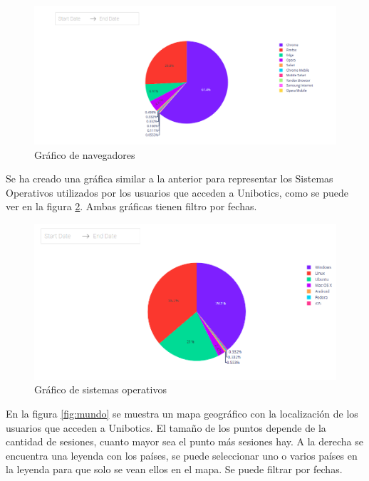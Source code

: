 \begin{figure}[H]
    \centering
    \includegraphics[width=19cm, keepaspectratio]{img/browser.png}
    \caption{Gráfico de navegadores}
    \label{fig:browser}
\end{figure}
\newpage
Se ha creado una gráfica similar a la anterior para representar los Sistemas Operativos utilizados por los usuarios que acceden a Unibotics, como se puede ver en la figura \ref{fig:os}. Ambas gráficas tienen filtro por fechas.


\begin{figure}[H]
    \centering
    \includegraphics[width=17cm, keepaspectratio]{img/os.png}
    \caption{Gráfico de sistemas operativos}
    \label{fig:os}
\end{figure}
\newpage
En la figura \ref{fig:mundo} se muestra un mapa geográfico con la localización de los usuarios que acceden a Unibotics. El tamaño de los puntos depende de la cantidad de sesiones, cuanto mayor sea el punto más sesiones hay. A la derecha se encuentra una leyenda con los países, se puede seleccionar uno o varios países en la leyenda para que solo se vean ellos en el mapa. Se puede filtrar por fechas.



